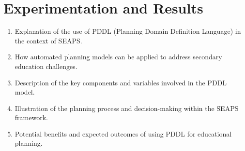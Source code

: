 \section{Experimentation and Results}
\begin{enumerate}
    \item Explanation of the use of PDDL (Planning Domain Definition Language) in the context of SEAPS.
    \item How automated planning models can be applied to address secondary education challenges.
    \item Description of the key components and variables involved in the PDDL model.
    \item Illustration of the planning process and decision-making within the SEAPS framework.
    \item Potential benefits and expected outcomes of using PDDL for educational planning.
\end{enumerate}